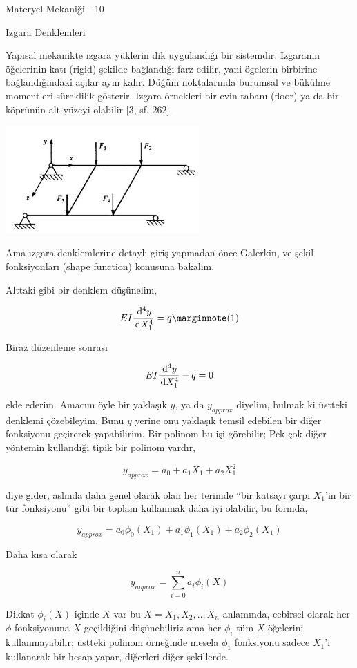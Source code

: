 \documentclass[12pt,fleqn]{article}\usepackage{../../common}
\begin{document}
Materyel Mekaniği - 10

Izgara Denklemleri

Yapısal mekanikte ızgara yüklerin dik uygulandığı bir sistemdir. Izgaranın
öğelerinin katı (rigid) şekilde bağlandığı farz edilir, yani ögelerin birbirine
bağlandığındaki açılar aynı kalır. Düğüm noktalarında burumsal ve bükülme
momentleri süreklilik gösterir. Izgara örnekleri bir evin tabanı (floor) ya da
bir köprünün alt yüzeyi olabilir [3, sf. 262].

\includegraphics[width=20em]{compscieng_bpp43fem_01.jpg}

Ama ızgara denklemlerine detaylı giriş yapmadan önce Galerkin, ve şekil
fonksiyonları (shape function) konusuna bakalım.

Alttaki gibi bir denklem düşünelim,

$$
E I \frac{\ud^4 y}{\ud X_1^4} = q
\mlabel{1}
$$

Biraz düzenleme sonrası

$$
E I \frac{\,\mathrm{d}^4 y}{\,\mathrm{d} X_1^4} - q = 0
$$

elde ederim. Amacım öyle bir yaklaşık $y$, ya da $y_{approx}$ diyelim, bulmak ki
üstteki denklemi çözebileyim. Bunu $y$ yerine onu yaklaşık temsil edebilen bir
diğer fonksiyonu geçirerek yapabilirim. Bir polinom bu işi görebilir; Pek çok
diğer yöntemin kullandığı tipik bir polinom vardır,

$$
y_{approx} = a_0 + a_1 X_1 + a_2 X_1^2 
$$

diye gider, aslında daha genel olarak olan her terimde ``bir katsayı çarpı
$X_1$'in bir tür fonksiyonu'' gibi bir toplam kullanmak daha iyi olabilir,
bu formda,

$$
y_{approx} = a_0 \phi_0(X_1) + a_1 \phi_1(X_1) + a_2 \phi_2(X_1) 
$$

Daha kısa olarak

$$
y_{approx} = \sum_{i=0}^{n} a_i \phi_i(X) 
$$

Dikkat $\phi_i(X)$ içinde $X$ var bu $X = X_1,X_2,..,X_n$ anlamında, cebirsel
olarak her $\phi$ fonksiyonuna $X$ geçildiğini düşünebiliriz ama her $\phi_i$
tüm $X$ öğelerini kullanmayabilir; üstteki polinom örneğinde mesela $\phi_1$
fonksiyonu sadece $X_1$'i kullanarak bir hesap yapar, diğerleri diğer şekillerde.
\end{document}
